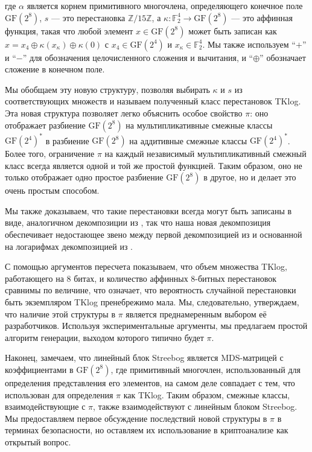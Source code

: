 где \(\alpha\) является корнем примитивного многочлена, определяющего конечное поле \(\text{GF}(2^8)\), \(s\) — это перестановка \( \mathbb{Z}/15\mathbb{Z} \), а \(\kappa: \mathbb{F}_2^4 \to \text{GF}(2^8)\) — это аффинная функция, такая что любой элемент \(x \in \text{GF}(2^8)\) может быть записан как \(x = x_4 \oplus \kappa(x_\kappa) \oplus \kappa(0)\) с \(x_4 \in \text{GF}(2^4)\) и \(x_\kappa \in \mathbb{F}_2^4\). Мы также используем “$+$” и “$-$” для обозначения целочисленного сложения и вычитания, и “$\oplus$” обозначает сложение в конечном поле.

Мы обобщаем эту новую структуру, позволяя выбирать \(\kappa\) и \(s\) из соответствующих множеств и называем полученный класс перестановок TKlog. Эта новая структура позволяет легко объяснить особое свойство \(\pi\): оно отображает разбиение \(\text{GF}(2^8)\) на мультипликативные смежные классы \(\text{GF}(2^4)^*\) в разбиение \(\text{GF}(2^8)\) на аддитивные смежные классы \(\text{GF}(2^4)^*\). Более того, ограничение \(\pi\) на каждый независимый мультипликативный смежный класс всегда является одной и той же простой функцией. Таким образом, оно не только отображает одно простое разбиение \(\text{GF}(2^8)\) в другое, но и делает это очень простым способом.

Мы также доказываем, что такие перестановки всегда могут быть записаны в виде, аналогичном декомпозиции из \cite{BPU16a}, так что наша новая декомпозиция обеспечивает недостающее звено между первой декомпозицией из \cite{BPU16a} и основанной на логарифмах декомпозицией из \cite{PU16}.

С помощью аргументов пересчета показываем, что объем множества TKlog, работающего на 8 битах, и количество аффинных 8-битных перестановок сравнимы по величине, что означает, что вероятность случайной перестановки быть экземпляром TKlog пренебрежимо мала. Мы, следовательно, утверждаем, что наличие этой структуры в \(\pi\) является преднамеренным выбором её разработчиков. Используя экспериментальные аргументы, мы предлагаем простой алгоритм генерации, выходом которого типично будет \(\pi\).

Наконец, замечаем, что линейный блок Streebog является MDS-матрицей с коэффициентами в \(\text{GF}(2^8)\), где примитивный многочлен, использованный для определения представления его элементов, на самом деле совпадает с тем, что использован для определения \(\pi\) как TKlog. Таким образом, смежные классы, взаимодействующие с \(\pi\), также взаимодействуют с линейным блоком Streebog. Мы предоставляем первое обсуждение последствий новой структуры в \(\pi\) в терминах безопасности, но оставляем их использование в криптоанализе как открытый вопрос.

